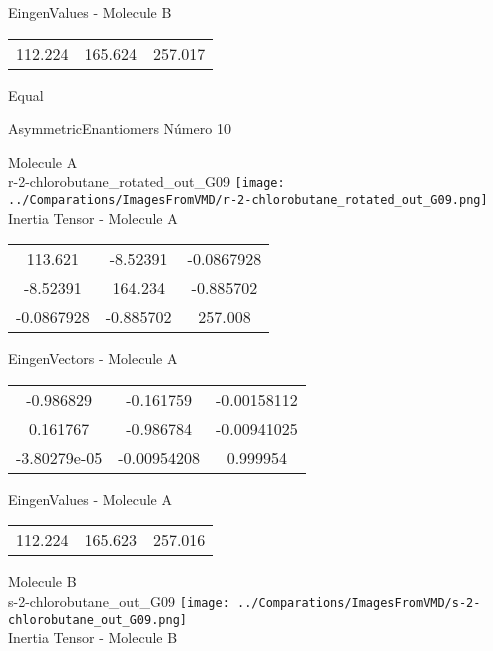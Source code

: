 \begin{multicols}{2}
\begin{center}
\vtab
 EingenValues - Molecule B     \\
\vtab
\begin{tabular}{|c c c|}
112.224	 & 	165.624	 & 	257.017	 \\
\end{tabular}

\end{center}
\end{multicols}
\begin{center}
\vtab
\vtab
\textcolor{NavyBlue}{\Large Equal}
\end{center}

 \newpage

\vtab[-2cm]
\begin{center}
{\large AsymmetricEnantiomers \tab Número 10}
\end{center}
\begin{multicols}{2}
\begin{center}

Molecule A \\ 
r-2-chlorobutane\_rotated\_out\_G09
\texttt{[image: ../Comparations/ImagesFromVMD/r-2-chlorobutane\_rotated\_out\_G09.png]}
\\
Inertia Tensor - Molecule A \\
\vtab

\begin{tabular}{|c c c|}
113.621	 & 	-8.52391	 & 	-0.0867928	 \\
-8.52391	 & 	164.234	 & 	-0.885702	 \\
-0.0867928	 & 	-0.885702	 & 	257.008
\end{tabular}

\vtab
 EingenVectors - Molecule A     \\
\vtab
\begin{tabular}{|c c c|}
-0.986829	 & 	-0.161759	 & 	-0.00158112	 \\
0.161767	 & 	-0.986784	 & 	-0.00941025	 \\
-3.80279e-05	 & 	-0.00954208	 & 	0.999954
\end{tabular}

\vtab
 EingenValues - Molecule A     \\
\vtab
\begin{tabular}{|c c c|}
112.224	 & 	165.623	 & 	257.016	 \\
\end{tabular}
\columnbreak

Molecule B \\ 
s-2-chlorobutane\_out\_G09
\texttt{[image: ../Comparations/ImagesFromVMD/s-2-chlorobutane\_out\_G09.png]}
\\
Inertia Tensor - Molecule B \\
\vtab


\end{center}
\end{multicols}
